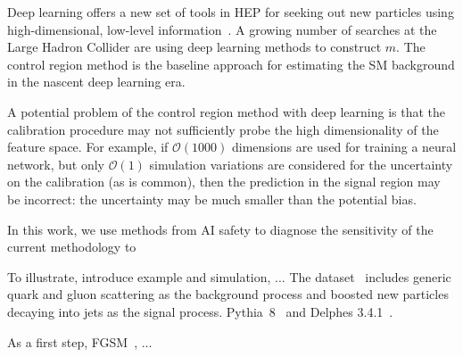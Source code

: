 \documentclass[reprint,nofootinbib,...]{revtex4-1}
\begin{document}
Deep learning offers a new set of tools in HEP for seeking out new particles using high-dimensional, low-level information~\cite{Baldi:2014kfa,Larkoski:2017jix,Radovic:2018dip,Guest:2018yhq}. A growing number of searches at the Large Hadron Collider are using deep learning methods to construct $m$. The control region method is the baseline approach for estimating the SM background in the nascent deep learning era.

A potential problem of the control region method with deep learning is that the calibration procedure may not sufficiently probe the high dimensionality of the feature space.  For example, if $\mathcal{O}(1000)$ dimensions are used for training a neural network, but only $\mathcal{O}(1)$ simulation variations are considered for the uncertainty on the calibration (as is common), then the prediction in the signal region may be incorrect: the uncertainty may be much smaller than the potential bias.

In this work, we use methods from AI safety to diagnose the sensitivity of the current methodology to 

To illustrate, introduce example and simulation, ...  The dataset~\cite{gregor_kasieczka_2019_2629073} includes generic quark and gluon scattering as the background process and boosted new particles decaying into jets as the signal process. Pythia~8~\cite{Sjostrand:2006za,Sjostrand:2007gs} and Delphes 3.4.1~\cite{deFavereau:2013fsa}.

As a first step, FGSM~\cite{DBLP:journals/corr/GoodfellowSS14}, ...
\end{document}
